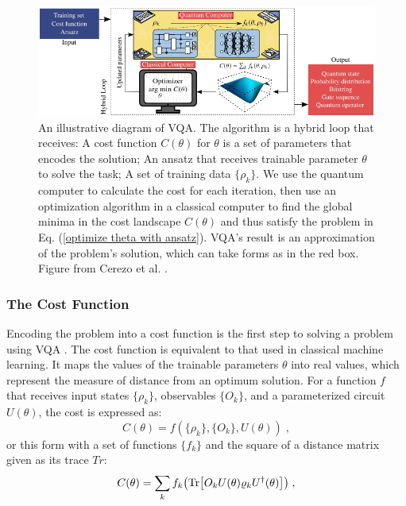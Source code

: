 \begin{figure}
    \centering
    \includegraphics[width=\textwidth]{LiteratureReview/Appendices/vqadiagram.png}
    \caption{
    An illustrative diagram of VQA. 
    The algorithm is a hybrid loop that receives: 
    A cost function $C(\theta)$ for $\theta$ is a set of parameters that encodes the solution; 
    An ansatz that receives trainable parameter $\theta$ to solve the task;
    A set of training data $\{\rho_k\}$.
    We use the quantum computer to calculate the cost for each iteration, then use an optimization algorithm in a classical computer to find the global minima in the cost landscape $C(\theta)$ and thus satisfy the problem in Eq. (\ref{optimize theta with ansatz}).
    VQA's result is an approximation of the problem's solution, which can take forms as in the red box.
    Figure from Cerezo et al. \cite{cerezo2021variational}.
    }
    \label{VQA diagram}
\end{figure}

\subsubsection{The Cost Function}
Encoding the problem into a cost function is the first step to solving a problem using VQA \cite{cerezo2021variational}.
The cost function is equivalent to that used in classical machine learning. 
It maps the values of the trainable parameters $\theta$ into real values, which represent the measure of distance from an optimum solution.
For a function $f$ that receives input states $\{\rho_k\}$, observables $\{O_k\}$, and a parameterized circuit $U(\theta)$, the cost is expressed as:
\begin{equation}
    C(\theta) = f(\{\rho_k\}, \{O_k\}, U(\theta)) \;,
\end{equation}
or this form with a set of functions $\{ f_k \}$ and the square of a distance matrix given as its trace $Tr$:
\begin{equation}
    C(\theta) = \sum_k f_k \left(\Tr[ O_k U(\theta) \rho_k U^\dagger(\theta) ]\right) \;,
    \label{Cost function}
\end{equation}

